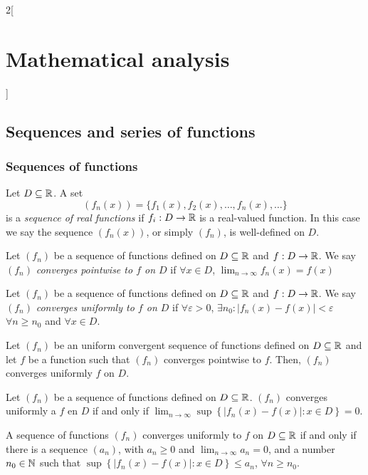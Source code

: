 \documentclass[../../../main.tex]{subfiles}
\begin{document}
\begin{multicols}{2}[\section{Mathematical analysis}]
\subsection{Sequences and series of functions}
\subsubsection*{Sequences of functions}
\begin{definition}
Let $D\subseteq\mathbb{R} $. A set $$(f_n(x))=\{f_1(x),f_2(x),\ldots,f_n(x),\ldots\}$$ is a \textit{sequence of real functions} if $f_i:D\rightarrow\mathbb{R} $ is a real-valued function. In this case we say the sequence $(f_n(x))$, or simply $(f_n)$, is well-defined on $D$.
\end{definition}
\begin{definition}
Let $(f_n)$ be a sequence of functions defined on $D\subseteq\mathbb{R} $ and $f:D\rightarrow\mathbb{R} $. We say $(f_n)$ \textit{converges pointwise to $f$ on $D$} if $\forall x\in D$, $\displaystyle\lim_{n\to\infty}f_n(x)=f(x)$
\end{definition}
\begin{definition}
Let $(f_n)$ be a sequence of functions defined on $D\subseteq\mathbb{R} $ and $f:D\rightarrow\mathbb{R} $. We say $(f_n)$ \textit{converges uniformly to $f$ on $D$} if $\forall\varepsilon>0$, $\exists n_0:|f_n(x)-f(x)|<\varepsilon$ $\forall n\geq n_0$ and $\forall x\in D$.
\end{definition}
\begin{lemma}
Let $(f_n)$ be an uniform convergent sequence of functions defined on $D\subseteq\mathbb{R} $ and let $f$ be a function such that $(f_n)$ converges pointwise to $f$. Then, $(f_n)$ converges uniformly $f$ on $D$.
\end{lemma}
\begin{lemma}
Let $(f_n)$ be a sequence of functions defined on $D\subseteq\mathbb{R} $. $(f_n)$ converges uniformly a $f$ en $D$ if and only if $\displaystyle \lim_{n\to\infty}\sup\left\{|f_n(x)-f(x)|:x\in D\right\}=0$.
\end{lemma}
\begin{corollary}
A sequence of functions $(f_n)$ converges uniformly to $f$ on $D\subseteq\mathbb{R} $ if and only if there is a sequence $(a_n)$, with $a_n\geq 0$ and $\displaystyle \lim_{n\to\infty} a_n=0$, and a number $\displaystyle n_0\in\mathbb{N} $ such that $\sup\left\{|f_n(x)-f(x)|: x\in D\right\}\leq a_n$, $\forall n\geq n_0$.
\end{corollary}
\begin{theorem}

\end{theorem}
\end{multicols}
\end{document}
